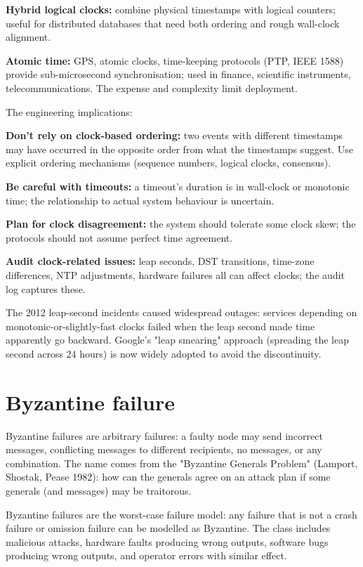 \textbf{Hybrid logical clocks:} combine physical timestamps with logical counters; useful for distributed databases that need both ordering and rough wall-clock alignment.

\textbf{Atomic time:} GPS, atomic clocks, time-keeping protocols (PTP, IEEE 1588) provide sub-microsecond synchronisation; used in finance, scientific instruments, telecommunications. The expense and complexity limit deployment.

The engineering implications:

\textbf{Don't rely on clock-based ordering:} two events with different timestamps may have occurred in the opposite order from what the timestamps suggest. Use explicit ordering mechanisms (sequence numbers, logical clocks, consensus).

\textbf{Be careful with timeouts:} a timeout's duration is in wall-clock or monotonic time; the relationship to actual system behaviour is uncertain.

\textbf{Plan for clock disagreement:} the system should tolerate some clock skew; the protocols should not assume perfect time agreement.

\textbf{Audit clock-related issues:} leap seconds, DST transitions, time-zone differences, NTP adjustments, hardware failures all can affect clocks; the audit log captures these.

The 2012 leap-second incidents caused widespread outages: services depending on monotonic-or-slightly-fast clocks failed when the leap second made time apparently go backward. Google's "leap smearing" approach (spreading the leap second across $24$ hours) is now widely adopted to avoid the discontinuity.

\section{Byzantine failure}

Byzantine failures are arbitrary failures: a faulty node may send incorrect messages, conflicting messages to different recipients, no messages, or any combination. The name comes from the "Byzantine Generals Problem" (Lamport, Shostak, Pease 1982): how can the generals agree on an attack plan if some generals (and messages) may be traitorous.

Byzantine failures are the worst-case failure model: any failure that is not a crash failure or omission failure can be modelled as Byzantine. The class includes malicious attacks, hardware faults producing wrong outputs, software bugs producing wrong outputs, and operator errors with similar effect.

